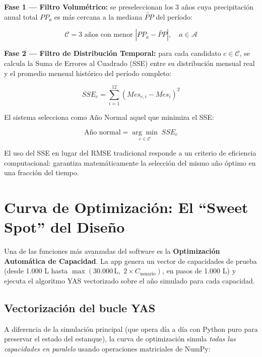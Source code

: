 \documentclass[12pt, a4paper]{article}
\begin{document}
\textbf{Fase 1 --- Filtro Volumétrico:} se preseleccionan los 3 años cuya precipitación anual total $PP_a$ es más cercana a la mediana $\tilde{PP}$ del período:

\begin{equation}
    \mathcal{C} = \text{3 años con menor } |PP_a - \tilde{PP}|,\quad a \in \mathcal{A}
\end{equation}

\textbf{Fase 2 --- Filtro de Distribución Temporal:} para cada candidato $c \in \mathcal{C}$, se calcula la Suma de Errores al Cuadrado (SSE) entre su distribución mensual real y el promedio mensual histórico del período completo:

\begin{equation}
    SSE_c = \sum_{i=1}^{12}\left(Mes_{c,i} - \overline{Mes}_i\right)^2
\end{equation}

El sistema selecciona como Año Normal aquel que minimiza el SSE:

\begin{equation}
    \text{Año normal} = \underset{c \in \mathcal{C}}{\arg\min}\; SSE_c
\end{equation}

El uso del SSE en lugar del RMSE tradicional responde a un criterio de eficiencia computacional: garantiza matemáticamente la selección del mismo año óptimo en una fracción del tiempo.

\section{Curva de Optimización: El ``Sweet Spot'' del Diseño}

Una de las funciones más avanzadas del software es la \textbf{Optimización Automática de Capacidad}. La app genera un vector de capacidades de prueba (desde 1.000 L hasta $\max(30.000\,\text{L},\; 2 \times C_{\text{usuario}})$, en pasos de 1.000 L) y ejecuta el algoritmo YAS vectorizado sobre el año simulado para cada capacidad.

\subsection{Vectorización del bucle YAS}

A diferencia de la simulación principal (que opera día a día con Python puro para preservar el estado del estanque), la curva de optimización simula \textit{todas las capacidades en paralelo} usando operaciones matriciales de NumPy:
\end{document}
